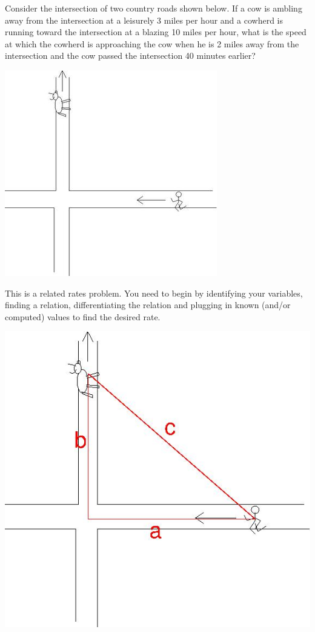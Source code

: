 \documentclass{ximera}
\author{Emma Smith Zbarsky}
\begin{document}
\begin{exercise}

Consider the intersection of two country roads shown below. If a cow is
ambling away from the intersection at a leisurely 3 miles per hour and a
cowherd is running toward the intersection at a blazing 10 miles per
hour, what is the speed at which the cowherd is approaching the cow when
he is 2 miles away from the intersection and the cow passed the
intersection 40 minutes earlier?



\begin{image}\includegraphics[width=.5\textwidth]{relatedrates-cow.jpg}\end{image}


\begin{hint}
This is a related rates problem. You need to begin by identifying your
variables, finding a relation, differentiating the relation and plugging
in known (and/or computed) values to find the desired rate.
\end{hint}


\begin{hint}
\begin{image}\includegraphics[width=.5\textwidth]{rr-cow-labeled.jpg}\end{image}




\end{hint}
\end{exercise}
\end{document}
